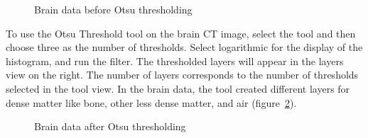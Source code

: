 \documentclass[fleqn,11pt,openany]{book}
\begin{document}
\begin{figure}
\caption{Brain data before Otsu thresholding}\label{fig:OtsuBefore}
\end{figure}

To use the Otsu Threshold tool on the brain CT image, select the tool and then choose three as the number of thresholds. Select logarithmic for the display of the histogram, and run the filter. The thresholded layers will appear in the layers view on the right. The number of layers corresponds to the number of thresholds selected in the tool view. In the brain data, the tool created different layers for dense matter like bone, other less dense matter, and air (figure~\ref{fig:OtsuAfter}).

\begin{figure}
\caption{Brain data after Otsu thresholding}\label{fig:OtsuAfter}
\end{figure}
\end{document}
